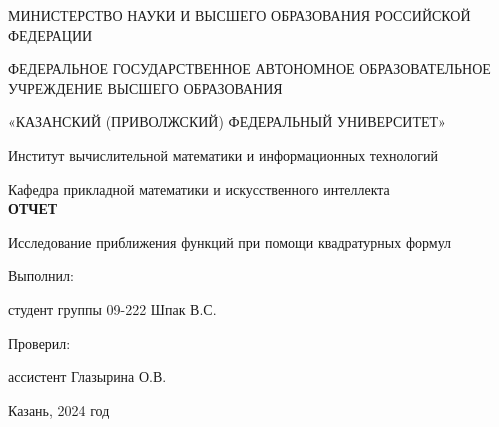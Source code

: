 \documentclass[12pt,a4paper]{report}
\begin{document}
	\begin{titlepage}
		\begin{center}
			\thispagestyle{empty}
			\large{МИНИСТЕРСТВО НАУКИ И ВЫСШЕГО ОБРАЗОВАНИЯ РОССИЙСКОЙ ФЕДЕРАЦИИ}
			
			\large{ФЕДЕРАЛЬНОЕ ГОСУДАРСТВЕННОЕ АВТОНОМНОЕ ОБРАЗОВАТЕЛЬНОЕ УЧРЕЖДЕНИЕ ВЫСШЕГО ОБРАЗОВАНИЯ}
			
			\large{«КАЗАНСКИЙ (ПРИВОЛЖСКИЙ) ФЕДЕРАЛЬНЫЙ УНИВЕРСИТЕТ»}
			
			\large{Институт вычислительной математики и информационных технологий}
			
			\large{Кафедра прикладной математики и искусственного  интеллекта}\\[50mm]
			
			\large{\textbf{ОТЧЕТ}}
			
			\large{Исследование приближения функций при помощи квадратурных формул}\\[90mm]
			
			\begin{flushright}
				
				Выполнил:
				
				студент группы 09-222 Шпак В.С.
				
				Проверил:
				
				ассистент Глазырина О.В.
				
			\end{flushright}
			
			\vfill
			
			{\large Казань, 2024 год}
			
		\end{center}
		
	\end{titlepage}
	
	\newpage %
	\setcounter{page}{2} 
	
	\tableofcontents
	
\end{document}
